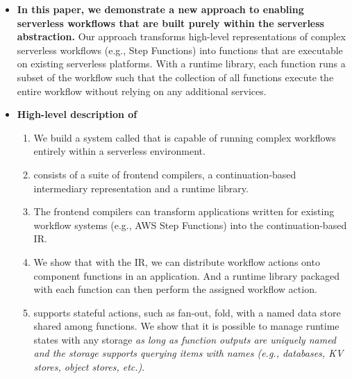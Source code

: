 \begin{itemize}
\begin{enumerate}
\begin{enumerate}
        \end{enumerate}

    \end{enumerate}



  \item \textbf{In this paper, we demonstrate a new approach to enabling
  serverless workflows that are built purely within the serverless
  abstraction.} Our approach transforms high-level representations of complex
  serverless workflows (e.g., Step Functions) into functions that are
  executable on existing serverless platforms. With a runtime library, each
  function runs a subset of the workflow such that the collection of all
  functions execute the entire workflow without relying on any additional
  services.

  \item \textbf{High-level description of \name{}}

    \begin{enumerate}

      \item We build a system called \name{} that is capable of running
      complex workflows entirely within a serverless environment.

      \item \name{} consists of a suite of frontend compilers, a
      continuation-based intermediary representation and a runtime library.

      \item The frontend compilers can transform applications written for
      existing workflow systems (e.g., AWS Step Functions) into the
      continuation-based
      \name{} IR.

      \item We show that with the IR, we can distribute workflow actions onto
      component functions in an application. And a runtime library packaged
      with each function can then perform the assigned workflow action.

      \item \name{} supports stateful actions, such as fan-out, fold, with a
      named data store shared among functions.  We show that it is possible to
      manage runtime states with any storage \emph{as long as function outputs
      are uniquely named and the storage supports querying items with names
      (e.g., databases, KV stores, object stores, etc.)}.
    \end{enumerate}


\end{itemize}
